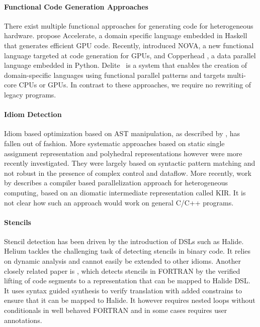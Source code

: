 {\paragraph*{Functional Code Generation Approaches}
    There exist multiple functional approaches for generating code for
    heterogeneous hardware.
    \citet{chakravarty11accelerating,mcdonell13optimising} propose Accelerate,
    a domain specific language embedded in Haskell that generates efficient GPU
    code.
    Recently, \citet{collins14nova} introduced NOVA, a new functional language
    targeted at code generation for GPUs, and Copperhead
    \cite{catanzaro11copperhead}, a data parallel language embedded in Python.
    Delite~\cite{brown11heterogeneous,chafi11domain} is a system that enables
    the creation of domain-specific languages using functional parallel patterns
    and targets multi-core CPUs or GPUs.
    In contrast to these approaches, we require no rewriting of legacy programs.

\paragraph*{Idiom Detection}
    Idiom based optimization based on AST manipulation, as described by
    \citet{Pinter:1994:POP:177492.177494}, has fallen out of fashion.
    More systematic approaches based on static single assignment representation
    \cite{lattner2004llvm} and polyhedral representations
    \cite{benabderrahmane2010polyhedral} however were more recently
    investigated.
    They were largely based on syntactic pattern matching and not robust in the
    presence of complex control and dataflow.
    More recently, work by \citet{Andion2015Compilation} describes a compiler
    based parallelization approach for heterogeneous computing, based on an
    diomatic intermediate representation called KIR.  
    It is not clear how such an approach would work on general C/C++ programs.

\paragraph*{Stencils}
    Stencil detection has been driven by the introduction of DSLs such as
    Halide.  Helium \cite{Mendis2015Helium} tackles the challenging task
    of detecting stencils in binary code. It relies
    on dynamic analysis and cannot easily be extended to
    other idioms.
    Another closely related paper is \cite{Kamil2016Verified}, which detects stencils in FORTRAN by the
    verified lifting of code segments to a representation that can be
    mapped to Halide DSL.  It uses syntax guided synthesis to verify
    translation with added constrains to ensure that it can be mapped to
    Halide.
    It however requires nested loops  without conditionals in well behaved FORTRAN
    and in some cases requires user annotations.

}
